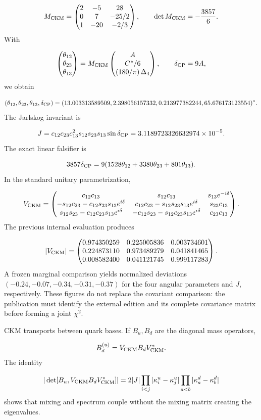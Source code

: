 \[
M_{\rm CKM}=
\begin{pmatrix}
2&-5&28\\
0&7&-25/2\\
1&-20&-2/3
\end{pmatrix},
\qquad
\det M_{\rm CKM}=-\frac{3857}{6}.
\]
With

\[
\begin{pmatrix}\theta_{12}\\\theta_{23}\\\theta_{13}\end{pmatrix}
=M_{\rm CKM}
\begin{pmatrix}A\\C^*/6\\{\left(180/\pi\right)\Delta_4}\end{pmatrix},
\qquad
\delta_{\rm CP}=9A,
\]
we obtain

\[
(\theta_{12},\theta_{23},\theta_{13},\delta_{\rm CP})
=
(13.003313589509,
2.398056157332,
0.213977382244,
65.676173123554)^\circ.
\]
The Jarlskog invariant is

\[
J=c_{12}c_{23}c_{13}^2s_{12}s_{23}s_{13}\sin\delta_{\rm CP}
=3.1189723326632974\times10^{-5}.
\]
The exact linear falsifier is

\[
3857\delta_{\rm CP}
=9(1528\theta_{12}+3380\theta_{23}+801\theta_{13}).
\]
In the standard unitary parametrization,

\[
V_{\rm CKM}=
\begin{pmatrix}
c_{12}c_{13}&s_{12}c_{13}&s_{13}e^{-i\delta}\cr
-s_{12}c_{23}-c_{12}s_{23}s_{13}e^{i\delta}&
c_{12}c_{23}-s_{12}s_{23}s_{13}e^{i\delta}&s_{23}c_{13}\cr
s_{12}s_{23}-c_{12}c_{23}s_{13}e^{i\delta}&
-c_{12}s_{23}-s_{12}c_{23}s_{13}e^{i\delta}&c_{23}c_{13}
\end{pmatrix}.
\]
The previous internal evaluation produces

\[
|V_{\rm CKM}|=
\begin{pmatrix}
0.974350259&0.225005836&0.003734601\cr
0.224873110&0.973489279&0.041841465\cr
0.008582400&0.041121745&0.999117283
\end{pmatrix}.
\]
A frozen marginal comparison yields normalized deviations \((-0.24,-0.07,-0.34,-0.31,-0.37)\) for the four angular parameters and \(J\), respectively. These figures do not replace the covariant comparison: the publication must identify the external edition and its complete covariance matrix before forming a joint \(\chi^2\).

CKM transports between quark bases. If \(B_u,B_d\) are the diagonal mass operators,

\[
B_d^{(u)}=V_{\rm CKM}B_dV_{\rm CKM}^*.
\]
The identity

\[
|\det[B_u,V_{\rm CKM}B_dV_{\rm CKM}^*]|
=2|J|
\prod_{i<j}|\kappa_i^u-\kappa_j^u|
\prod_{a<b}|\kappa_a^d-\kappa_b^d|
\]
shows that mixing and spectrum couple without the mixing matrix creating the eigenvalues.

